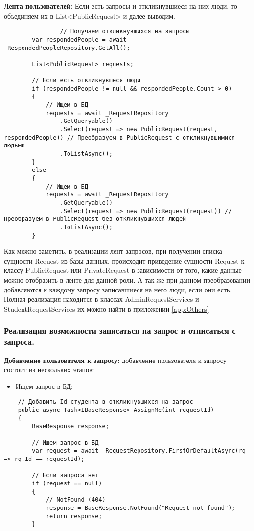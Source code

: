 \textbf{Лента пользователей:}  Если есть запросы и откликнувшиеся на них люди, то объединяем их в List<PublicRequest> и далее выводим.
\begin{verbatim}
				// Получаем откликнувшихся на запросы
        var respondedPeople = await _RespondedPeopleRepository.GetAll();

        List<PublicRequest> requests;

        // Если есть откликнувшеся люди
        if (respondedPeople != null && respondedPeople.Count > 0)
        {
            // Ищем в БД
            requests = await _RequestRepository
                .GetQueryable()
                .Select(request => new PublicRequest(request, respondedPeople)) // Преобразуем в PublicRequest с откликнувшимися людьми
                .ToListAsync();
        }
        else
        {
            // Ищем в БД
            requests = await _RequestRepository
                .GetQueryable()
                .Select(request => new PublicRequest(request)) // Преобразуем в PublicRequest без откликнувшихся людей
                .ToListAsync();
        }
\end{verbatim}

Как можно заметить, в реализации лент запросов, при получении списка сущности Request из базы данных, происходит приведение сущности Request к классу PublicRequest или PrivateRequest в зависимости от того, какие данные можно отобразить в ленте для данной роли. А так же при данном преобразовании добавляются к каждому запросу записавшиеся на него люди, если они есть. Полная реализация находится в классах AdminRequestServices и StudentRequestServices их можно найти в приложении \ref{app:Others}

\subsubsection{Реализация возможности записаться на запрос и отписаться с запроса.}

\textbf{Добавление пользователя к запросу:} добавление пользователя к запросу состоит из нескольких этапов:
\begin{itemize}
	\item{Ищем запрос в БД:}
\end{itemize}
\begin{verbatim}
    // Добавить Id студента в откликнувшихся на запрос
    public async Task<IBaseResponse> AssignMe(int requestId)
    {
        BaseResponse response;

        // Ищем запрос в БД
        var request = await _RequestRepository.FirstOrDefaultAsync(rq => rq.Id == requestId);

        // Если запроса нет
        if (request == null)
        {
            // NotFound (404)
            response = BaseResponse.NotFound("Request not found");
            return response;
        }

\end{verbatim}

